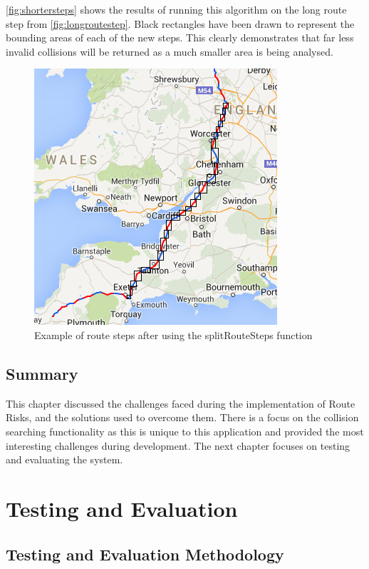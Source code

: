 \documentclass[authoryearcitations]{UoYCSproject}
\begin{document}
 \autoref{fig:shortersteps} shows the results of running this algorithm on the long route step from \autoref{fig:longroutestep}. Black rectangles have been drawn to represent the bounding areas of each of the new steps. This clearly demonstrates that far less invalid collisions will be returned as a much smaller area is being analysed.

\begin{figure}
	\center
	\includegraphics[scale=0.7]{shortersteps}
	\caption{Example of route steps after using the splitRouteSteps function}
	\label{fig:shortersteps}
\end{figure}

\section{Summary}
This chapter discussed the challenges faced during the implementation of Route Risks, and the solutions used to overcome them. There is a focus on the collision searching functionality as this is unique to this application and provided the most interesting challenges during development. The next chapter focuses on testing and evaluating the system.

\chapter{Testing and Evaluation}

\section{Testing and Evaluation Methodology}
\end{document}
